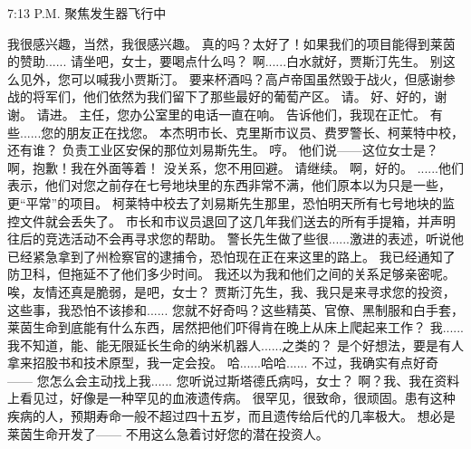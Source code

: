 \documentclass[openany]{book}
\begin{document}
7:13 P.M. 聚焦发生器飞行中
\begin{dialogue}
     我很感兴趣，当然，我很感兴趣。
     真的吗？太好了！如果我们的项目能得到莱茵的赞助......
     请坐吧，女士，要喝点什么吗？
     啊......白水就好，贾斯汀先生。
     别这么见外，您可以喊我小贾斯汀。
     要来杯酒吗？高卢帝国虽然毁于战火，但感谢参战的将军们，他们依然为我们留下了那些最好的葡萄产区。
     请。
     好、好的，谢谢。
     请进。
     主任，您办公室里的电话一直在响。
     告诉他们，我现在正忙。
     有些......您的朋友正在找您。
     本杰明市长、克里斯市议员、费罗警长、柯莱特中校，还有谁？
     负责工业区安保的那位刘易斯先生。
     哼。
     他们说——这位女士是？
     啊，抱歉！我在外面等着！
     没关系，您不用回避。
     请继续。
     啊，好的。
     ......他们表示，他们对您之前存在七号地块里的东西非常不满，他们原本以为只是一些，更“平常”的项目。
     柯莱特中校去了刘易斯先生那里，恐怕明天所有七号地块的监控文件就会丢失了。
     市长和市议员退回了这几年我们送去的所有手提箱，并声明往后的竞选活动不会再寻求您的帮助。
     警长先生做了些很......激进的表述，听说他已经紧急拿到了州检察官的逮捕令，恐怕现在正在来这里的路上。
     我已经通知了防卫科，但拖延不了他们多少时间。
     我还以为我和他们之间的关系足够亲密呢。
     唉，友情还真是脆弱，是吧，女士？
     贾斯汀先生，我、我只是来寻求您的投资，这些事，我恐怕不该掺和......
     您就不好奇吗？这些精英、官僚、黑制服和白手套，莱茵生命到底能有什么东西，居然把他们吓得肯在晚上从床上爬起来工作？
     我......我不知道，能、能无限延长生命的纳米机器人......之类的？
     是个好想法，要是有人拿来招股书和技术原型，我一定会投。
     哈......哈哈......
     不过，我确实有点好奇——
     您怎么会主动找上我......
     您听说过斯塔德氏病吗，女士？
     啊？我、我在资料上看见过，好像是一种罕见的血液遗传病。
     很罕见，很致命，很顽固。患有这种疾病的人，预期寿命一般不超过四十五岁，而且遗传给后代的几率极大。
     想必是莱茵生命开发了——
     不用这么急着讨好您的潜在投资人。

\end{dialogue}
\end{document}
